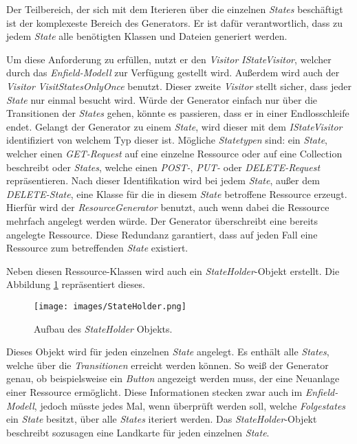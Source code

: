 Der Teilbereich, der sich mit dem Iterieren über die einzelnen \textit{States} beschäftigt ist der komplexeste Bereich des Generators. Er ist dafür verantwortlich, dass zu jedem \textit{State} alle benötigten Klassen und Dateien generiert werden. 

Um diese Anforderung zu erfüllen, nutzt er den \textit{Visitor} \textit{IStateVisitor}, welcher durch das \textit{Enfield-Modell} zur Verfügung gestellt wird. Außerdem wird auch der \textit{Visitor} \textit{VisitStatesOnlyOnce} benutzt. Dieser zweite \textit{Visitor} stellt sicher, dass jeder \textit{State} nur einmal besucht wird. Würde der Generator einfach nur über die Transitionen der \textit{States} gehen, könnte es passieren, dass er in einer Endlosschleife endet. Gelangt der Generator zu einem \textit{State}, wird dieser mit dem \textit{IStateVisitor} identifiziert von welchem Typ dieser ist. Mögliche \textit{Statetypen} sind: ein \textit{State}, welcher einen \textit{GET-Request} auf eine einzelne Ressource oder auf eine Collection beschreibt oder \textit{States}, welche einen \textit{POST-}, \textit{PUT-} oder \textit{DELETE-Request} repräsentieren.  Nach dieser Identifikation wird bei jedem \textit{State}, außer dem \textit{DELETE-State}, eine Klasse für die in diesem \textit{State} betroffene Ressource erzeugt. Hierfür wird der \textit{ResourceGenerator} benutzt, auch wenn dabei die Ressource mehrfach angelegt werden würde. Der Generator überschreibt eine bereits angelegte Ressource. Diese Redundanz garantiert, dass auf jeden Fall eine Ressource zum betreffenden \textit{State} existiert. 

Neben diesen Ressource-Klassen wird auch ein \textit{StateHolder}-Objekt erstellt. Die Abbildung \ref{fig:stateHolder} repräsentiert dieses. 

\begin{figure}[H]
	\begin{center}
		\texttt{[image: images/StateHolder.png]}
		\caption{Aufbau des \textit{StateHolder} Objekts.}
		\label{fig:stateHolder}
	\end{center}
\end{figure}

Dieses Objekt wird für jeden einzelnen \textit{State} angelegt. Es enthält alle \textit{States}, welche über die \textit{Transitionen} erreicht werden können.
So weiß der Generator genau, ob beispielsweise ein \textit{Button} angezeigt werden muss, der eine Neuanlage einer Ressource ermöglicht. Diese Informationen stecken zwar auch im \textit{Enfield-Modell}, jedoch müsste jedes Mal, wenn überprüft werden soll, welche \textit{Folgestates} ein \textit{State} besitzt, über alle \textit{States} iteriert werden. Das \textit{StateHolder}-Objekt beschreibt sozusagen eine Landkarte für jeden einzelnen \textit{State}.

